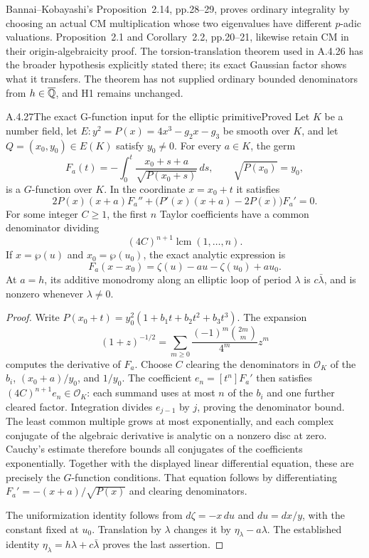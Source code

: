 Bannai--Kobayashi's Proposition~2.14, pp.28--29, proves ordinary integrality by choosing an actual CM multiplication whose two eigenvalues have different $p$-adic valuations. Proposition~2.1 and Corollary~2.2, pp.20--21, likewise retain CM in their origin-algebraicity proof. The torsion-translation theorem used in A.4.26 has the broader hypothesis explicitly stated there; its exact Gaussian factor shows what it transfers. The theorem has not supplied ordinary bounded denominators from $h\in\overline{\mathbb Q}$, and H1 remains unchanged.


\begin{result}{A.4.27}{The exact G-function input for the elliptic primitive}{Proved}
Let $K$ be a number field, let $E:y^2=P(x)=4x^3-g_2x-g_3$ be smooth over $K$, and let $Q=(x_0,y_0)\in E(K)$ satisfy $y_0\ne0$. For every $a\in K$, the germ
\[
 F_a(t)=-\int_0^t\frac{x_0+s+a}{\sqrt{P(x_0+s)}}\,ds,
 \qquad \sqrt{P(x_0)}=y_0,
\]
is a $G$-function over $K$. In the coordinate $x=x_0+t$ it satisfies
\[
 2P(x)(x+a)F_a''+
 \bigl(P'(x)(x+a)-2P(x)\bigr)F_a'=0.
\]
For some integer $C\ge1$, the first $n$ Taylor coefficients have a common denominator dividing
\[
 (4C)^{n+1}\operatorname{lcm}(1,\ldots,n).
\]
If $x=\wp(u)$ and $x_0=\wp(u_0)$, the exact analytic expression is
\[
 F_a(x-x_0)=\zeta(u)-au-\zeta(u_0)+au_0.
\]
At $a=h$, its additive monodromy along an elliptic loop of period $\lambda$ is $c\bar\lambda$, and is nonzero whenever $\lambda\ne0$.
\end{result}
\begin{proof}
Write $P(x_0+t)=y_0^2(1+b_1t+b_2t^2+b_3t^3)$. The expansion
\[
 (1+z)^{-1/2}=
 \sum_{m\ge0}\frac{(-1)^m\binom{2m}{m}}{4^m}z^m
\]
computes the derivative of $F_a$. Choose $C$ clearing the denominators in $\mathcal O_K$ of the $b_i$, $(x_0+a)/y_0$, and $1/y_0$. The coefficient $e_n=[t^n]F_a'$ then satisfies $(4C)^{n+1}e_n\in\mathcal O_K$: each summand uses at most $n$ of the $b_i$ and one further cleared factor. Integration divides $e_{j-1}$ by $j$, proving the denominator bound. The least common multiple grows at most exponentially, and each complex conjugate of the algebraic derivative is analytic on a nonzero disc at zero. Cauchy's estimate therefore bounds all conjugates of the coefficients exponentially. Together with the displayed linear differential equation, these are precisely the $G$-function conditions. That equation follows by differentiating $F_a'=-(x+a)/\sqrt{P(x)}$ and clearing denominators.

The uniformization identity follows from $d\zeta=-x\,du$ and $du=dx/y$, with the constant fixed at $u_0$. Translation by $\lambda$ changes it by $\eta_\lambda-a\lambda$. The established identity $\eta_\lambda=h\lambda+c\bar\lambda$ proves the last assertion.
\end{proof}

